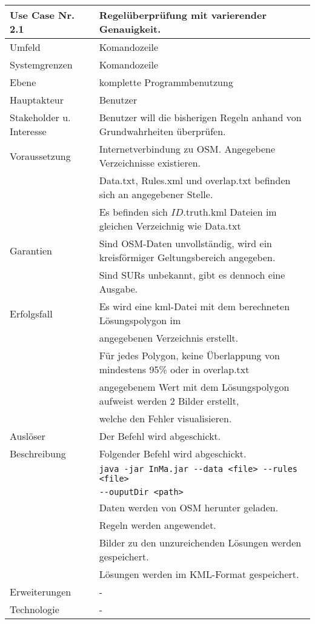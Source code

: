 \begin{tabular}{| l | l |}
 \hline
 \textbf{Use Case Nr. 2.1} & Regelüberprüfung mit varierender Genauigkeit.\\
 \hline
 Umfeld & Komandozeile\\
 \hline
 Systemgrenzen & Komandozeile\\
 \hline
 Ebene & komplette Programmbenutzung\\
 \hline
 Hauptakteur & Benutzer\\
 \hline
 Stakeholder u. Interesse & Benutzer will die bisherigen Regeln anhand von Grundwahrheiten überprüfen.\\
 \hline
 Voraussetzung & Internetverbindung zu OSM. Angegebene Verzeichnisse existieren.\\
        & Data.txt, Rules.xml und overlap.txt befinden sich an angegebener Stelle. \\
        & Es befinden sich $ID$.truth.kml Dateien im gleichen Verzeichnig wie Data.txt \\
 \hline
 Garantien & Sind OSM-Daten unvollständig, wird ein kreisförmiger Geltungsbereich angegeben.\\
    & Sind SURs unbekannt, gibt es dennoch eine Ausgabe.\\
 \hline
 Erfolgsfall & Es wird eine kml-Datei mit dem berechneten Lösungspolygon im\\
      & angegebenen Verzeichnis erstellt.\\
      & Für jedes Polygon, keine Überlappung von mindestens 95\% oder in overlap.txt \\
      & angegebenem Wert mit dem Lösungspolygon aufweist werden 2 Bilder erstellt,\\
      & welche den Fehler visualisieren.\\
 \hline
 Auslöser & Der Befehl wird abgeschickt.\\
 \hline
 Beschreibung & Folgender Befehl wird abgeschickt.\\
      & \verb|java -jar InMa.jar --data <file> --rules <file>|\\
      & \hspace{24pt} \verb|--ouputDir <path>|\\
      & Daten werden von OSM herunter geladen.\\
      & Regeln werden angewendet.\\
      & Bilder zu den unzureichenden Lösungen werden gespeichert.\\
      & Lösungen werden im KML-Format gespeichert.\\
 \hline
 Erweiterungen & -\\
 \hline
 Technologie & -\\
 \hline
\end{tabular}


